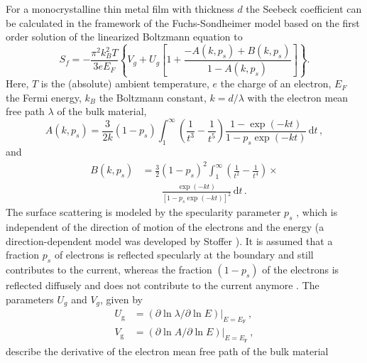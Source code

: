 \documentclass[journal]{IEEEtran}
\newcommand{\mathrmm}[1]{{#1}}
\begin{document}
For a monocrystalline thin metal film with thickness $d$ the Seebeck coefficient can be calculated in the framework of the Fuchs-Sondheimer model based on the first order solution of the linearized Boltzmann equation to \cite{tellier1982size}
%
\begin{equation}
S_{\mathrmm{f}}=-\frac{\pi^{2}k_{\mathrmm{B}}^2T}{3eE_{\mathrmm{F}}}\left\{
V_{\mathrmm{g}}+U_{\mathrmm{g}}\left[  1+\frac{-A(k,p_s)+B(k,p_s)}{1-A(k,p_s)}\right]
\right\}  .\label{Sf}%
\end{equation}
%
Here, $T$ is the (absolute) ambient temperature, $e$ the charge of an
electron, $E_{\mathrmm{F}}$ the Fermi energy, $k_{\mathrmm{B}}$ the Boltzmann
constant, $k=d/\lambda$ with the electron mean free path $\lambda$ of the bulk
material,
%
\begin{equation}
A(k,p_s)=\frac{3}{2k}(1-p_s)\int_{1}^{\infty}\!\left(  \frac{1}{t^{3}}-\frac
{1}{t^{5}}\right)  \frac{1-\exp\left(  -kt\right)  }{1-p_s\exp\left(
-kt\right)  }\,\mathrm{d}t \, ,
\end{equation}
%
and
%
\begin{align}
B(k,p_s)&=\frac{3}{2}(1-p_s)^{2}\int_{1}^{\infty}\!\left(  \frac{1}{t^{2}}-\frac
{1}{t^{4}}\right) \times \nonumber \\ & \qquad  \frac{\exp\left(  -kt\right)  }{\left[  1-p_s\exp\left(
-kt\right)  \right]  ^{2}}\,\mathrm{d}t \, .
\end{align}
%
The surface scattering is modeled by the specularity parameter $p_s$
\cite{sondheimer_mean_1952}, which is independent of the direction of motion of the electrons and the energy (a direction-dependent model was developed by
Stoffer \cite{soffer1967statistical}). It is assumed that a fraction $p_s$ of
electrons is reflected specularly at the boundary and still contributes to the
current, whereas the fraction $(1-p_s)$ of the electrons is reflected diffusely
and does not contribute to the current anymore \cite{sondheimer_mean_1952}.
The parameters $U_{\mathrmm{g}}$ and $V_{\mathrmm{g}}$, given by
%
\begin{subequations}
\begin{align}
U_{\mathrm{g}} &  =\left(  \partial\ln\lambda/\partial\ln E\right)  \bigg
|_{E=E_{\mathrm{F}}}\, , \\ 
V_{\mathrm{g}} &  =\left(  \partial\ln A/\partial\ln E\right)  \bigg
|_{E=E_{\mathrm{F}}} \, ,
\end{align}
\end{subequations}
%
describe the derivative of the electron mean free path of the bulk material
\end{document}
